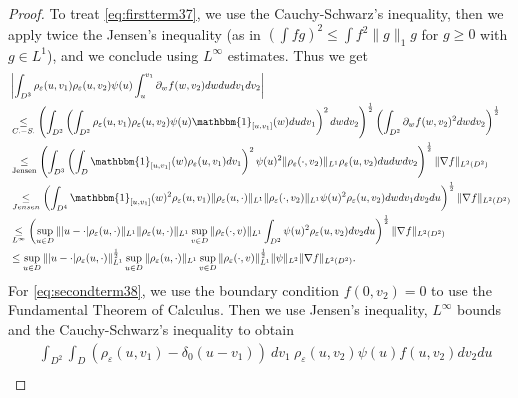 \documentclass[a4paper, reqno, 12pt]{amsart}
\theoremstyle{plain}
\theoremstyle{definition}
\begin{document}
\begin{proof}
    To treat \eqref{eq:firstterm37}, we use the Cauchy-Schwarz's inequality, then we apply twice the Jensen's inequality (as in 
    $(\int f g )^2 \leq \int f^2\|g\|_1 g$ for $g\geq0$ with $g\in L^1$), and  we conclude using $L^{\infty}$ estimates. Thus we get
    \begin{align} 
        &\left| \int_{D^3} \rho_{\varepsilon}(u,v_1)\rho_{\varepsilon}(u,v_2)\psi(u) \int_u^{v_1} \partial_w f(w,v_2) dw dudv_1dv_2 \right| \nonumber \\
        & \underset{C.-S.}{\leq}\left(\int_{D^2} \left( \int_{D^2} \rho_{\varepsilon}(u,v_1)\rho_{\varepsilon}(u,v_2)\psi(u) \mathbbm{1}_{[u,v_1]}(w) dudv_1\right)^2 dw dv_2 \right)^\frac{1}{2} \left(\int_{D^2} \partial_w f(w,v_2)^2 dw dv_2 \right)^{\frac{1}{2}} \nonumber\\
        &\underset{\text{Jensen}}{\leq} \left(\int_{D^3}  \left(\int_{D}  \mathbbm{1}_{[u,v_1]}(w) \rho_{\varepsilon}(u,v_1)dv_1\right)^2\psi(u)^2 \|\rho_{\varepsilon}(\cdot,v_2)\|_{L^1}\rho_{\varepsilon}(u,v_2)du dw  dv_2\right)^\frac{1}{2} \| \nabla f\|_{L^2(D^2)} \nonumber \\
        & \underset{Jensen}{\leq} \left(\int_{D^4}   \mathbbm{1}_{[u,v_1]}(w)^2 \rho_{\varepsilon}(u,v_1) \|\rho_{\varepsilon}(u,\cdot)\|_{L^1}  \|\rho_{\varepsilon}( \cdot,v_2)\|_{L^1}\psi(u)^2\rho_{\varepsilon}(u,v_2) dw dv_1 dv_2du   \right)^\frac{1}{2} \| \nabla f\|_{L^2(D^2)} \nonumber\\
        & \underset{L^{\infty}}{\leq} \left(\sup_{u\in D} \||u-\cdot|\rho_{\varepsilon}(u,\cdot)\|_{L^1} \|\rho_{\varepsilon}(u,\cdot)\|_{L^1} \sup_{v\in D}\|\rho_{\varepsilon}( \cdot,v)\|_{L^1} \int_{D^2}  \psi(u)^2\rho_{\varepsilon}(u,v_2)    dv_2du   \right)^\frac{1}{2} \| \nabla f\|_{L^2(D^2)} \nonumber\\
        & \leq \sup_{u\in D} \||u-\cdot|\rho_{\varepsilon}(u,\cdot)\|_{L^1}^{\frac{1}{2}} \sup_{u\in D} \|\rho_{\varepsilon}(u,\cdot)\|_{L^1} \sup_{v\in D}\|\rho_{\varepsilon}( \cdot,v)\|_{L^1}^{\frac{1}{2}}\|\psi\|_{L^2}  \| \nabla f\|_{L^2(D^2)}.  \label{eq:bigrhoestimate1}
    \end{align}
For  \eqref{eq:secondterm38}, we use the boundary condition $f(0,v_2) = 0$ to use the Fundamental Theorem of Calculus. Then we use Jensen's inequality, $L^{\infty}$ bounds and  the Cauchy-Schwarz's inequality to obtain
    \begin{align} \label{eq:bigrhoestimate2}
        &\int_{D^2} \int_D (\rho_{\varepsilon}(u,v_1)-\delta_0(u-v_1)) \ dv_1 \ \rho_{\varepsilon}(u,v_2) \psi(u) f(u,v_2)dv_2 du  \nonumber\\

\end{align}
\end{proof}
\end{document}
